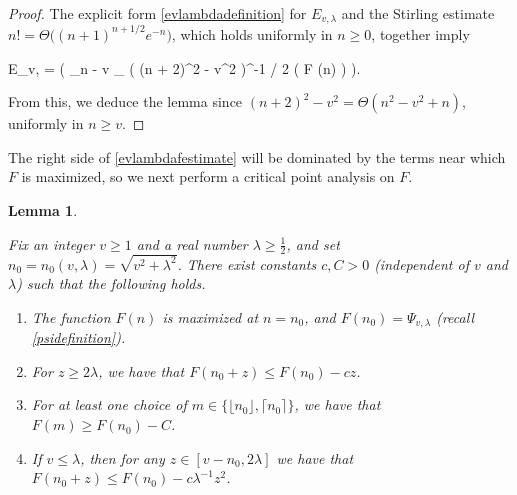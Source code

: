 \documentclass[10pt,a4paper]{article}
\theoremstyle{plain}\newtheorem{theorem}{Theorem}
\newtheorem{lemma}[theorem]{Lemma}
\theoremstyle{definition}
\begin{document}
	\begin{proof} 
	
	The explicit form \eqref{evlambdadefinition} for $E_{v, \lambda}$ and the Stirling estimate $n! = \Theta \big( (n + 1)^{n + 1 /2} e^{- n} \big)$, which holds uniformly in $n \ge 0$, together imply 
	\begin{flalign*}
	E_{v, \lambda} = \Theta \Bigg( \displaystyle\sum_{n - v  _{}} \big( (n + 2)^2  - v^2 \big)^{-1 / 2} \exp \big( F (n) \big) \Bigg).
	\end{flalign*} 
	
	\noindent From this, we deduce the lemma since $(n + 2)^2 - v^2 = \Theta (n^2 - v^2 + n)$, uniformly in $n \ge v$. 
	\end{proof} 
	
	The right side of \eqref{evlambdafestimate} will be dominated by the terms near which $F$ is maximized, so we next perform a critical point analysis on $F$. 
	
	\begin{lemma} 
	
	\label{fn0}
	
	Fix an integer $v \ge 1$ and a real number $\lambda \ge \frac{1}{2}$, and set $n_0 = n_0 (v, \lambda) =  \sqrt{v^2 + \lambda^2}$. There exist constants $c, C > 0$ (independent of $v$ and $\lambda$) such that the following holds.
	
	\begin{enumerate}
	    \item The function $F (n)$ is maximized at $n = n_0$, and $F (n_0) = \Psi_{v, \lambda}$ (recall \eqref{psidefinition}). 
	   
	    \item For $z \ge 2 \lambda$, we have that $F (n_0 + z) \le F (n_0) - c z$.
	    
	    \item For at least one choice of $m \in \big\{ \lfloor n_0 \rfloor, \lceil n_0 \rceil \big\}$, we have that $F (m) \ge F (n_0) - C$.
	    
	    \item If $v \le \lambda$, then for any $z \in [v - n_0, 2 \lambda]$ we have that $F (n_0 + z) \le F (n_0) - c \lambda^{-1} z^2$.
	     
	\end{enumerate}
	\end{lemma} 
	
\end{document}
